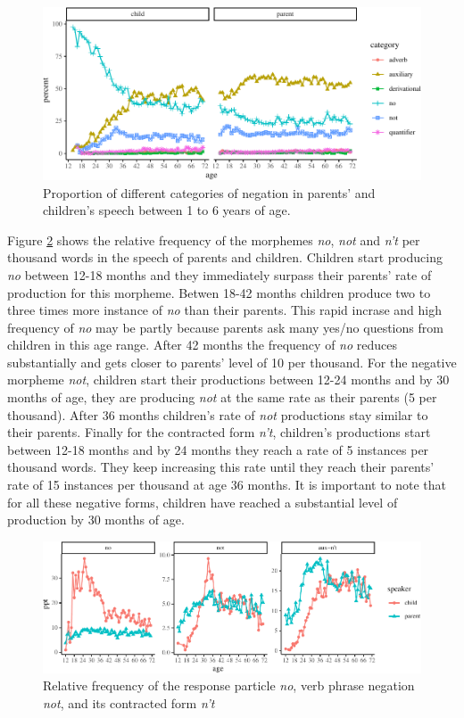\documentclass[man,floatsintext,draftall]{apa6}
\begin{document}
\begin{figure}
\centering
\includegraphics{negation_production_files/figure-latex/negationProportionPlot-1.pdf}
\caption{\label{fig:negationProportionPlot}Proportion of different categories of negation in parents' and children's speech between 1 to 6 years of age.}
\end{figure}

Figure \ref{fig:negationRelativeFrequency} shows the relative frequency of the morphemes \emph{no}, \emph{not} and \emph{n't} per thousand words in the speech of parents and children. Children start producing \emph{no} between 12-18 months and they immediately surpass their parents' rate of production for this morpheme. Betwen 18-42 months children produce two to three times more instance of \emph{no} than their parents. This rapid incrase and high frequency of \emph{no} may be partly because parents ask many yes/no questions from children in this age range. After 42 months the frequency of \emph{no} reduces substantially and gets closer to parents' level of 10 per thousand. For the negative morpheme \emph{not}, children start their productions between 12-24 months and by 30 months of age, they are producing \emph{not} at the same rate as their parents (5 per thousand). After 36 months children's rate of \emph{not} productions stay similar to their parents. Finally for the contracted form \emph{n't}, children's productions start between 12-18 months and by 24 months they reach a rate of 5 instances per thousand words. They keep increasing this rate until they reach their parents' rate of 15 instances per thousand at age 36 months. It is important to note that for all these negative forms, children have reached a substantial level of production by 30 months of age.

\begin{figure}
\centering
\includegraphics{negation_production_files/figure-latex/negationRelativeFrequency-1.pdf}
\caption{\label{fig:negationRelativeFrequency}Relative frequency of the response particle \emph{no}, verb phrase negation \emph{not}, and its contracted form \emph{n't}}
\end{figure}
\end{document}
